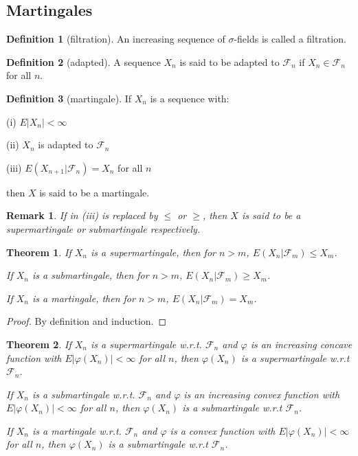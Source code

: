 \documentclass{article}
\newtheorem{Thm}{Theorem}[section]
\newtheorem*{Rk}{Remark}
\theoremstyle{definition}
\newtheorem{Def}{Definition}[section]
\begin{document}
\subsection{Martingales}
\begin{Def}[filtration]
An increasing sequence of $\sigma$-fields is called a filtration.
\end{Def}
\begin{Def}[adapted]
A sequence $X_n$ is said to be adapted to $\mathcal{F}_n$ if $X_n\in\mathcal{F}_n$ for all $n$.
\end{Def}
\begin{Def}[martingale]
If $X_n$ is a sequence with:\par
(i) $E\left|X_n\right|<\infty$\par
(ii) $X_n$ is adapted to $\mathcal{F}_n$\par
(iii) $E(X_{n+1}|\mathcal{F}_n)=X_n$ for all $n$\par
then $X$ is said to be a martingale.
\end{Def}
\begin{Rk}
If in (iii) is replaced by $\le$ or $\ge$, then $X$ is said to be a supermartingale or submartingale respectively.
\end{Rk}
\begin{Thm}
If $X_n$ is a supermartingale, then for $n>m$, $E(X_n|\mathcal{F}_m)\le X_m$.\par
If $X_n$ is a submartingale, then for $n>m$, $E(X_n|\mathcal{F}_m)\ge X_m$.\par
If $X_n$ is a martingale, then for $n>m$, $E(X_n|\mathcal{F}_m)= X_m$.
\end{Thm}
\begin{proof}
By definition and induction.
\end{proof}
\begin{Thm}
If $X_n$ is a supermartingale w.r.t. $\mathcal{F}_n$ and $\varphi$ is an increasing  concave function with $E\left|\varphi(X_n)\right|<\infty$ for all $n$, then $\varphi(X_n)$ is a supermartingale w.r.t $\mathcal{F}_n$. \par
If $X_n$ is a submartingale w.r.t. $\mathcal{F}_n$ and $\varphi$ is an increasing  convex function with $E\left|\varphi(X_n)\right|<\infty$ for all $n$, then $\varphi(X_n)$ is a submartingale w.r.t $\mathcal{F}_n$. \par
If $X_n$ is a martingale w.r.t. $\mathcal{F}_n$ and $\varphi$ is a convex function with $E\left|\varphi(X_n)\right|<\infty$ for all $n$, then $\varphi(X_n)$ is a submartingale w.r.t $\mathcal{F}_n$. 
\end{Thm}
\end{document}
